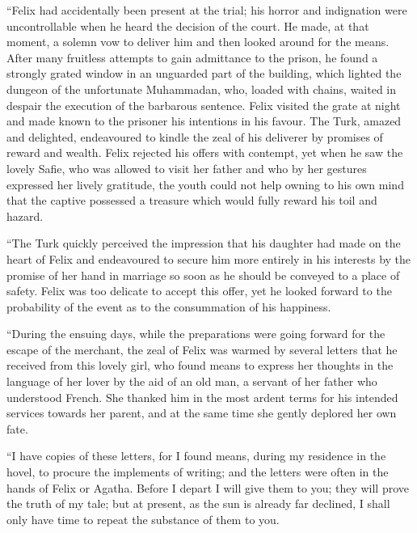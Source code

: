 \documentclass[12pt,openright]{book}
\begin{document}
“Felix had accidentally been present at the trial; his horror and indignation were uncontrollable when he heard the decision of the court. He made, at that moment, a solemn vow to deliver him and then looked around for the means. After many fruitless attempts to gain admittance to the prison, he found a strongly grated window in an unguarded part of the building, which lighted the dungeon of the unfortunate Muhammadan, who, loaded with chains, waited in despair the execution of the barbarous sentence. Felix visited the grate at night and made known to the prisoner his intentions in his favour. The Turk, amazed and delighted, endeavoured to kindle the zeal of his deliverer by promises of reward and wealth. Felix rejected his offers with contempt, yet when he saw the lovely Safie, who was allowed to visit her father and who by her gestures expressed her lively gratitude, the youth could not help owning to his own mind that the captive possessed a treasure which would fully reward his toil and hazard.

“The Turk quickly perceived the impression that his daughter had made on the heart of Felix and endeavoured to secure him more entirely in his interests by the promise of her hand in marriage so soon as he should be conveyed to a place of safety. Felix was too delicate to accept this offer, yet he looked forward to the probability of the event as to the consummation of his happiness.

“During the ensuing days, while the preparations were going forward for the escape of the merchant, the zeal of Felix was warmed by several letters that he received from this lovely girl, who found means to express her thoughts in the language of her lover by the aid of an old man, a servant of her father who understood French. She thanked him in the most ardent terms for his intended services towards her parent, and at the same time she gently deplored her own fate.

“I have copies of these letters, for I found means, during my residence in the hovel, to procure the implements of writing; and the letters were often in the hands of Felix or Agatha. Before I depart I will give them to you; they will prove the truth of my tale; but at present, as the sun is already far declined, I shall only have time to repeat the substance of them to you.
\end{document}
